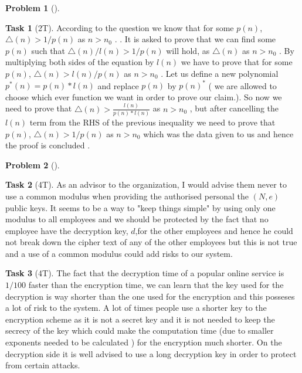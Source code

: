 \documentclass[11pt,twoside]{article}
\theoremstyle{definition}
\newtheorem{amsproblem}{Problem}
\newtheorem{amssubproblem}{Task}[amsproblem]
\newenvironment{problem}[1][]{%
  \begin{amsproblem}[#1]
  }{%
  \end{amsproblem}
}
\newenvironment{subproblem}[1][]{%
  \begin{amssubproblem}[#1]
  }{%
  \end{amssubproblem}
}
\newcommand{\TP}[1]{#1T}
\begin{document}
\begin{problem}
\begin{subproblem}[\TP{2}]
    According to the question we know that for some \textit{$p(n)$}, $\triangle(n) > 1/p(n)$  as $n>n_0$ .
    . It is asked to prove that we can find some  \textit{$p(n)$} such that $\triangle(n)/{l(n)} > 1/p(n)$ will hold, as $\triangle(n)$ as $n>n_0$ . By multiplying both sides of the equation by \textit{$l(n)$} we have to prove that for some \textit{$p(n)$}, $\triangle(n) > l(n)/p(n)$  as $n>n_0$ .\newline
    Let us define a new polynomial $p^*(n)={p(n)*l(n)}$ and replace $p(n)$ by ${p(n)^*}$ ( we are allowed to choose which ever function we want in order to prove our claim.). So now we need to prove that  $\triangle(n) > \frac{l(n)}{p(n)*l(n)}$  as $n>n_0$ , but after cancelling the $l(n)$ term from the RHS of the previous inequality we need to prove that \textit{$p(n)$}, $\triangle(n) > {1}/{p(n)}$  as $n>n_0$  which was the data given to us and hence the proof is concluded .%
  \end{subproblem}
\end{problem}

\noindent
\hrulefill

\begin{problem}
  \begin{subproblem}[\TP{4}]
    As an advisor to the organization, I would advise them never to use a common modulus when providing the authorised personal the $(N,e)$ public keys. It seems to be a way to "keep things simple" by using only one modulus to all employees and we should be protected by the fact that no employee have the decryption key, $d$,for the other employees and hence he could not break down the cipher text of any of the other employees but this is not true and a use of a common modulus could add risks to our system.    %
  \end{subproblem}
  \begin{subproblem}[\TP{4}]
    The fact that the decryption time of a popular online service is $1/100$ faster than the encryption time, we can learn that the key used for the decryption is way shorter than the one used for the encryption and this posseses a lot of risk to the system. A lot of times people use a shorter key to the encryption scheme as it is not a secret key and it is not needed to keep the secrecy of the key which could make the computation time (due to smaller exponents needed to be calculated ) for the encryption much shorter. On the decryption side it is well advised to use a long decryption key in order to protect from certain attacks.     %
  \end{subproblem}
\end{problem}

\noindent
\hrulefill
\end{document}
